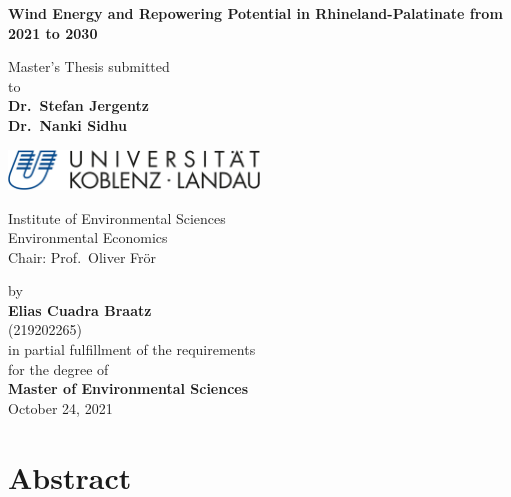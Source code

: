 \documentclass[a4paper,11pt]{article}
\begin{document}
\thispagestyle{empty}
\begin{center}
  \vspace*{5mm}
  \linespread{1.5}
  {\huge{\bf Wind Energy and Repowering Potential in Rhineland-Palatinate from 2021 to 2030}\par}\vspace{1cm}
  Master's Thesis submitted \\\vspace{0.5cm}
  to \\\vspace{0.5cm}
  \textbf{Dr.~Stefan Jergentz} \\
  \textbf{Dr.~Nanki Sidhu} \\\vspace{1.5cm}
  
  
  \includegraphics[width=0.5\textwidth]{Uni-Logo-2.jpg}
  
  Institute of Environmental Sciences \\
  Environmental Economics \\
   Chair: Prof.~Oliver Frör \\  \vspace{1cm}

  
  
  by \\\vspace{0.5cm}
  \textbf{Elias Cuadra Braatz} \\
  (219202265) \\
  
  \medskip
  \medskip
  in partial fulfillment of the requirements \\
  for the degree of \\
  \textbf{Master of Environmental Sciences} \\\vspace{0.5cm}
  October 24, 2021
  
\end{center}


\newpage
\tableofcontents
\clearpage

\newpage
\hypertarget{abstract}{%
\section*{Abstract}\label{abstract}}
\end{document}
